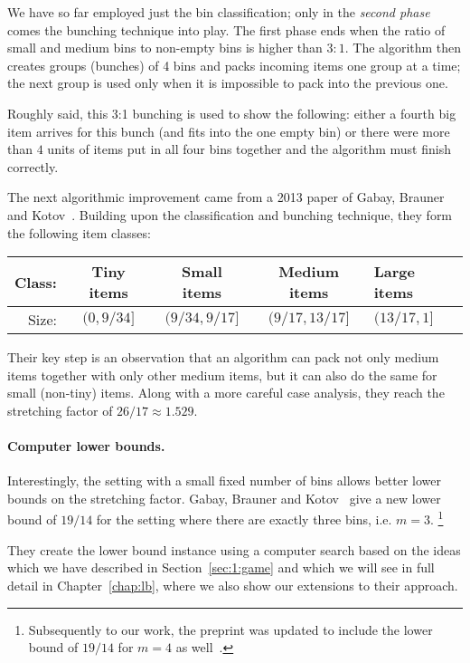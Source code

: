 We have so far employed just the bin classification; only in the
\emph{second phase} comes the bunching technique into play. The first
phase ends when the ratio of small and medium bins to non-empty bins
is higher than $3:1$. The algorithm then creates groups (bunches) of 4
bins and packs incoming items one group at a time; the next group is
used only when it is impossible to pack into the previous one.

Roughly said, this 3:1 bunching is used to show the following: either
a fourth big item arrives for this bunch (and fits into the one empty
bin) or there were more than $4$ units of items put in all four bins
together and the algorithm must finish correctly.

\smallskip

The next algorithmic improvement came from a 2013 paper of Gabay,
Brauner and Kotov~\cite{gabay2013}. Building upon the classification
and bunching technique, they form the following item classes:

\begin{center}
  \begin{tabular}{ r | c | c | c | l }
    Class: & Tiny items & Small items & Medium items & Large items \\ \hline
    Size: & $(0,9/34]$  & $(9/34, 9/17]$ & $(9/17, 13/17]$  & $(13/17,1]$  
  \end{tabular}
\end{center}

Their key step is an observation that an algorithm can pack not only
medium items together with only other medium items, but it can also do
the same for small (non-tiny) items. Along with a more careful case
analysis, they reach the stretching factor of $26/17 \approx 1.529$.

\paragraph{Computer lower bounds.} Interestingly, the setting with a
small fixed number of bins allows better lower bounds on the
stretching factor. Gabay, Brauner and Kotov~\cite{gabay2013lbv2} give
a new lower bound of $19/14$ for the setting where there are exactly
three bins, i.e. $m=3$. \footnote{Subsequently to our work, the
preprint \cite{gabay2013lbv2} was updated to include the lower bound
of $19/14$ for $m=4$ as well~\cite{gabay2015lbv3}.}

They create the lower bound instance using a computer search based on
the ideas which we have described in Section~\ref{sec:1:game} and which we will see
in full detail in Chapter~\ref{chap:lb}, where we also show our extensions to
their approach.

